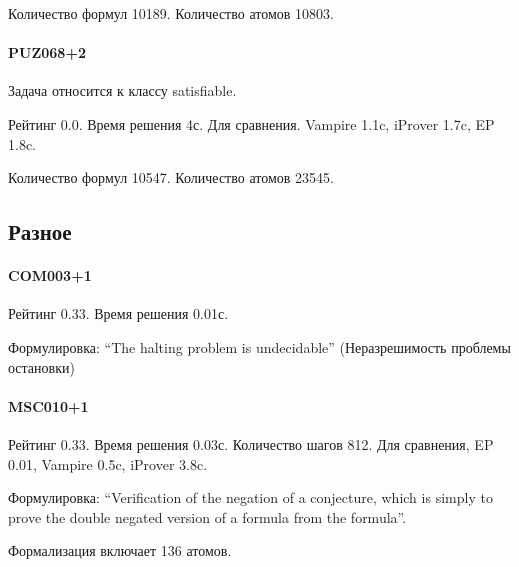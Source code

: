 Количество формул 10189. Количество атомов 10803.


\paragraph{PUZ068+2}
Задача относится к классу satisfiable.

Рейтинг 0.0. Время решения 4с. Для сравнения. Vampire 1.1c, iProver 1.7c, EP 1.8c.


Количество формул 10547. Количество атомов 23545.




\subsection{Разное}

\paragraph{COM003+1}
Рейтинг 0.33. Время решения 0.01с.

Формулировка: ``The halting problem is undecidable'' (Неразрешимость проблемы остановки)







\paragraph{MSC010+1}
Рейтинг 0.33. Время решения 0.03с. Количество шагов 812. Для сравнения, EP 0.01, Vampire 0.5c, iProver 3.8c.

Формулировка: ``Verification of the negation of a conjecture, which is simply to prove the double negated version of a formula from the formula''.

Формализация включает 136 атомов.



